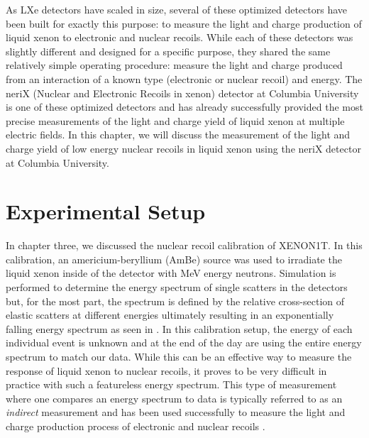 As LXe detectors have scaled in size, several of these optimized detectors have been built for exactly this purpose: to measure the light and charge production of liquid xenon to electronic and nuclear recoils.  While each of these detectors was slightly different and designed for a specific purpose, they shared the same relatively simple operating procedure: measure the light and charge produced from an interaction of a known type (electronic or nuclear recoil) and energy.  The neriX (Nuclear and Electronic Recoils in xenon) detector at Columbia University is one of these optimized detectors and has already successfully provided the most precise measurements of the light and charge yield of liquid xenon at multiple electric fields.  In this chapter, we will discuss the measurement of the light and charge yield of low energy nuclear recoils in liquid xenon using the neriX detector at Columbia University.

\section{Experimental Setup}
\label{sec:nerix_expt_setup}

In chapter three, we discussed the nuclear recoil calibration of XENON1T.  In this calibration, an americium-beryllium (AmBe) source was used to irradiate the liquid xenon inside of the detector with MeV energy neutrons.  Simulation is performed to determine the energy spectrum of single scatters in the detectors but, for the most part, the spectrum is defined by the relative cross-section of elastic scatters at different energies ultimately resulting in an exponentially falling energy spectrum as seen in .  In this calibration setup, the energy of each individual event is unknown and at the end of the day are using the entire energy spectrum to match our data.  While this can be an effective way to measure the response of liquid xenon to nuclear recoils, it proves to be very difficult in practice with such a featureless energy spectrum.  This type of measurement where one compares an energy spectrum to data is typically referred to as an \textit{indirect} measurement and has been used successfully to measure the light and charge production process of electronic and nuclear recoils \cite{aprile2013response, akerib2016tritium, aprile2017tritium}.

